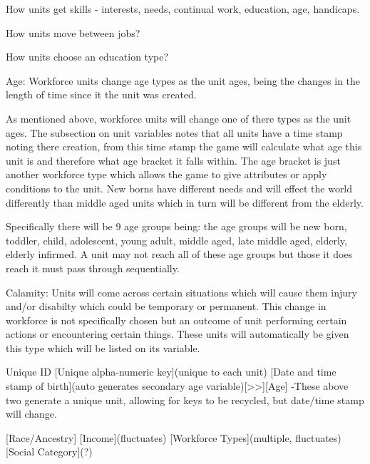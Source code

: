 How units get skills - interests, needs, continual work, education, age, handicaps.

How units move between jobs?

How units choose an education type?


Age:
Workforce units change age types as the unit ages, being the changes in the length of time since it the unit was created. 

As mentioned above, workforce units will change one of there types as the unit ages. The subsection on unit variables notes that all units have a time stamp noting there creation, from this time stamp the game will calculate what age this unit is and therefore what age bracket it falls within. The age bracket is just another workforce type which allows the game to give attributes or apply conditions to the unit. New borns have different needs and will effect the world differently than middle aged units which in turn will be different from the elderly. 

Specifically there will be 9 age groups being: the age groups will be new born, toddler, child, adolescent, young adult, middle aged, late middle aged, elderly, elderly infirmed. A unit may not reach all of these age groups but those it does reach it must pass through sequentially.


Calamity:
Units will come across certain situations which will cause them injury and/or disabilty which could be temporary or permanent. This change in workforce is not specifically chosen but an outcome of unit performing certain actions or encountering certain things. These units will automatically be given this type which will be listed on its variable.  



Unique ID
[Unique alpha-numeric key](unique to each unit)
[Date and time stamp of birth](auto generates secondary age variable)[>>][Age]
-These above two generate a unique unit, allowing for keys to be recycled, but date/time stamp will change.

[Race/Ancestry]
[Income](fluctuates)
[Workforce Types](multiple, fluctuates)
[Social Category](?)

